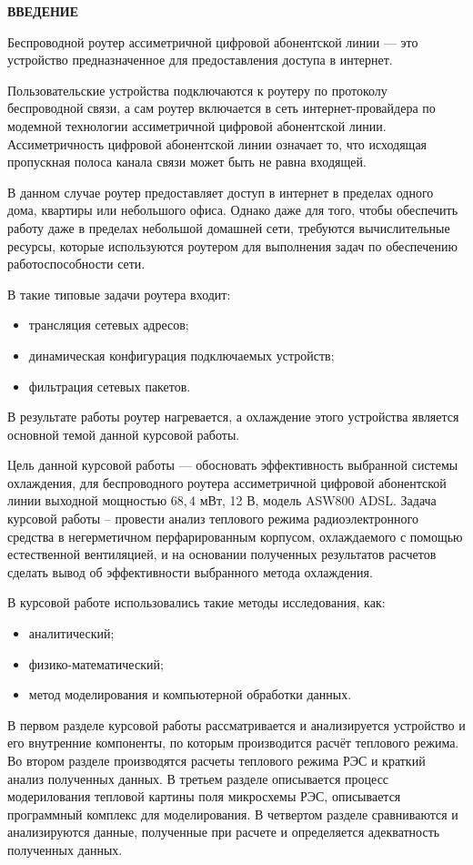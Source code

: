 \begin{center}
\textbf{ВВЕДЕНИЕ}
\end{center}

\par
Беспроводной роутер ассиметричной цифровой абонентской линии — это
устройство предназначенное для предоставления доступа в интернет.
\par
Пользовательские устройства подключаются к роутеру по протоколу
беспроводной связи, а сам роутер включается в сеть интернет-провайдера
по модемной технологии ассиметричной цифровой абонентской линии.
Ассиметричность цифровой абонентской линии означает то, что исходящая
пропускная полоса канала связи может быть не равна входящей.
\par
В данном случае роутер предоставляет доступ в интернет в пределах
одного дома, квартиры или небольшого офиса.
Однако даже для того, чтобы обеспечить работу даже в пределах
небольшой домашней сети, требуются вычислительные ресурсы,
которые используются роутером для выполнения задач
по обеспечению работоспособности сети.

В такие типовые задачи роутера входит:
\begin{itemize}[nosep]

\item трансляция сетевых адресов;
\item динамическая конфигурация подключаемых устройств;
\item фильтрация сетевых пакетов.
  
\end{itemize}

В результате работы роутер нагревается, а охлаждение этого устройства
является основной темой данной курсовой работы.

Цель данной курсовой работы — обосновать эффективность выбранной
системы охлаждения, для беспроводного роутера ассиметричной цифровой
абонентской линии выходной мощностью
$68,4$ мВт, 12 В, модель ASW800 ADSL.
Задача курсовой работы – провести анализ теплового режима
радиоэлектронного средства в негерметичном перфарированным корпусом,
охлаждаемого с помощью естественной вентиляцией, и на основании
полученных результатов расчетов сделать вывод об эффективности
выбранного метода охлаждения.

В курсовой работе использовались такие методы исследования, как:
\begin{itemize}[nosep]
\item аналитический;
\item физико-математический;
\item метод моделирования и компьютерной обработки данных.  
\end{itemize}

В первом разделе курсовой работы рассматривается и анализируется
устройство и его внутренние компоненты, по которым производится
расчёт теплового режима. Во втором разделе производятся расчеты
теплового режима РЭС и краткий анализ полученных данных.
В третьем разделе описывается процесс модерилования тепловой
картины поля микросхемы РЭС, описывается программный комплекс для моделирования.
В четвертом разделе сравниваются и анализируются данные, полученные при расчете
и определяется адекватность полученных данных.

\newpage
